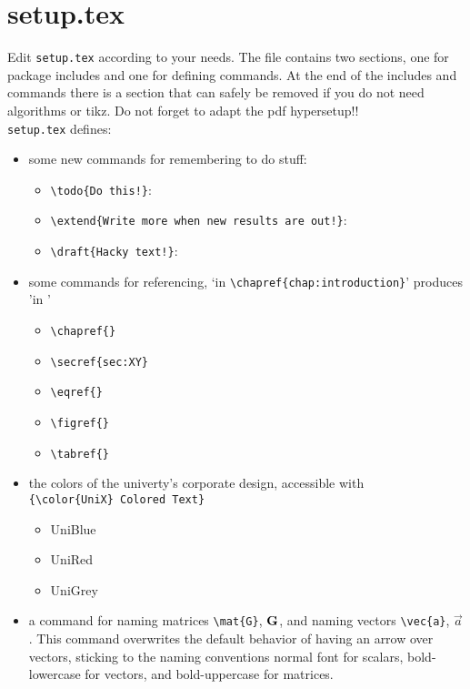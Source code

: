 \section{setup.tex}\label{sec:setup}

Edit \texttt{setup.tex} according to your needs. The file contains two sections, one for package includes and one for defining commands. At the end of the includes and commands there is a section that can safely be removed if you do not need algorithms or tikz. Do not forget to adapt the pdf hypersetup!!\\
\texttt{setup.tex} defines:
\begin{itemize}
    \item some new commands for remembering to do stuff:
    \begin{itemize}
        \item \verb|\todo{Do this!}|: 
        \item \verb|\extend{Write more when new results are out!}|:\\ 
        \item \verb|\draft{Hacky text!}|: 
    \end{itemize}

    \item some commands for referencing, `in \verb|\chapref{chap:introduction}|' produces 'in '
    \begin{itemize}
        \item \verb|\chapref{}|
        \item \verb|\secref{sec:XY}|
        \item \verb|\eqref{}|
        \item \verb|\figref{}|
        \item \verb|\tabref{}|
    \end{itemize}

    \item the colors of the univerty's corporate design, accessible with\\ \verb|{\color{UniX} Colored Text}|
    \begin{itemize}
        \item {\color{UniBlue}UniBlue}
        \item {\color{UniRed}UniRed}
        \item {\color{UniGrey}UniGrey}
    \end{itemize}

    \item a command for naming matrices \verb|\mat{G}|, $\mathbf{G}$, and naming vectors \verb|\vec{a}|, $\vec{a}$. This command overwrites the default behavior of having an arrow over vectors, sticking to the naming conventions  normal font for scalars, bold-lowercase for vectors, and bold-uppercase for matrices.


\end{itemize}
